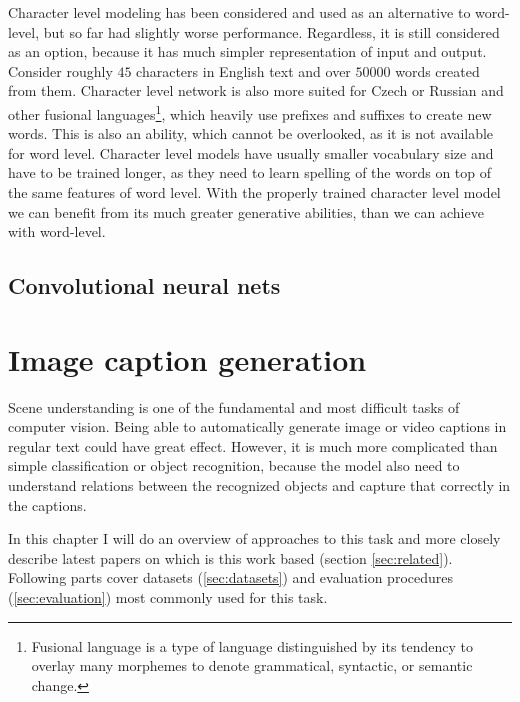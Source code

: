 Character level modeling has been considered and used as an alternative to word-level, but so far had slightly worse performance. Regardless, it is still considered as an option, because it has much simpler representation of input and output. Consider roughly $ 45 $ characters in English text and over $ 50 000 $ words created from them. Character level network is also more suited for Czech or Russian and other fusional languages\footnote{Fusional language is a type of language distinguished by its tendency to overlay many morphemes to denote grammatical, syntactic, or semantic change.}, which heavily use prefixes and suffixes to create new words. This is also an ability, which cannot be overlooked, as it is not available for word level.
Character level models have usually smaller vocabulary size and have to be trained longer, as they need to learn spelling of the words on top of the same features of word level. With the properly trained character level model we can benefit from its much greater generative abilities, than we can achieve with word-level.

	\section{Convolutional neural nets}

\chapter{Image caption generation}

Scene understanding is one of the fundamental and most difficult tasks of computer vision. Being able to automatically generate image or video captions in regular text could have great effect. However, it is much more complicated than simple classification or object recognition, because the model also need to understand relations between the recognized objects and capture that correctly in the captions.

In this chapter I will do an overview of approaches to this task and more closely describe latest papers on which is this work based (section \ref{sec:related}). Following parts cover datasets (\ref{sec:datasets}) and evaluation procedures (\ref{sec:evaluation}) most commonly used for this task.


